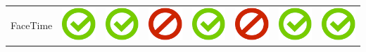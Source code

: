 \documentclass[10pt,foldmark,tumble]{leaflet}
\begin{document}
{\begin{tabular}{ L{2cm} | C{2cm} | C{2cm} | C{2cm} | C{2cm} | C{2cm} | C{2cm} | C{2cm} | }
FaceTime & \includegraphics[scale=0.1]{pics/haken.png} & \includegraphics[scale=0.1]{pics/haken.png} & \includegraphics[scale=0.1]{pics/nohaken.png} & \includegraphics[scale=0.1]{pics/haken.png} & \includegraphics[scale=0.1]{pics/nohaken.png} & \includegraphics[scale=0.1]{pics/haken.png} & \includegraphics[scale=0.1]{pics/haken.png} \tabularnewline

\end{tabular}}
\end{document}
